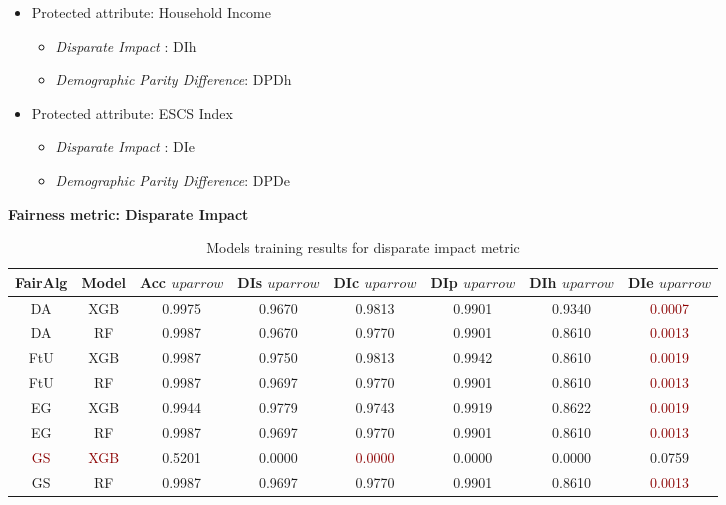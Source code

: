 \begin{itemize}
\begin{itemize}
        \item Protected attribute: Household Income
        \begin{itemize}
            \item \emph{Disparate Impact }: DIh
            \item \emph{Demographic Parity Difference}: DPDh
        \end{itemize}
        \item Protected attribute: ESCS Index
        \begin{itemize}
            \item \emph{Disparate Impact }: DIe
            \item \emph{Demographic Parity Difference}: DPDe
        \end{itemize}
    \end{itemize}
\end{itemize}

\textbf{Fairness metric: Disparate Impact}

\begin{table}
    \centering
    \begin{tabular}{|c|c|c|c|c|c|c|c|}
        \hline
        \textbf{FairAlg} & \textbf{Model} & \textbf{Acc} $uparrow$ & \textbf{DIs} $uparrow$ & \textbf{DIc} $uparrow$ & \textbf{DIp} $uparrow$ & \textbf{DIh} $uparrow$ & \textbf{DIe} $uparrow$ \\
        \hline
        DA & XGB & 0.9975 & 0.9670 & 0.9813 & 0.9901 & 0.9340 & \textcolor{darkred}{0.0007} \\
        \hline
        DA & RF & 0.9987 & 0.9670 & 0.9770 & 0.9901 & 0.8610 & \textcolor{darkred}{0.0013} \\
        \hline
        FtU & XGB & 0.9987 & 0.9750 & 0.9813 & 0.9942 & 0.8610 & \textcolor{darkred}{0.0019} \\
        \hline
        FtU & RF & 0.9987 & 0.9697 & 0.9770 & 0.9901 & 0.8610 & \textcolor{darkred}{0.0013} \\
        \hline
        EG & XGB & 0.9944 & 0.9779 & 0.9743 & 0.9919 & 0.8622 & \textcolor{darkred}{0.0019} \\
        \hline
        EG & RF & 0.9987 & 0.9697 & 0.9770 & 0.9901 & 0.8610 & \textcolor{darkred}{0.0013} \\
        \hline
        \textcolor{darkred}{GS} & \textcolor{darkred}{XGB} & 0.5201 & 0.0000 & \textcolor{darkred}{0.0000} & 0.0000 & 0.0000 & 0.0759 \\
        \hline
        GS & RF & 0.9987 & 0.9697 & 0.9770 & 0.9901 & 0.8610 & \textcolor{darkred}{0.0013} \\
        \hline
    \end{tabular}
    \caption{Models training results for disparate impact metric}
    \label{tab:results_di}
\end{table}

